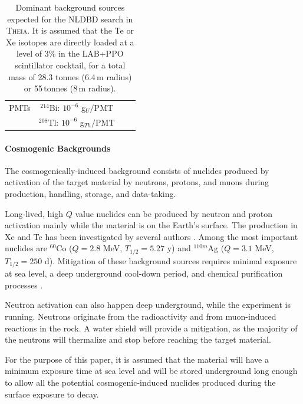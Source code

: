 \begin{table}[t]
\begin{tabular}{lccc}
PMTs                                        & $^{214}$Bi: $10^{-6}$ g$_{U}/$PMT            &                                               \\
                                            & $^{208}$Tl: $10^{-6}$ g$_{Th}/$PMT           &                                               \\
\bottomrule
\end{tabular}
\caption{Dominant background sources expected for the NLDBD search in
\textsc{Theia}. It is assumed that the Te or Xe isotopes are directly
loaded at a level of 3\% in the LAB+PPO scintillator cocktail, for a
total mass of 28.3 tonnes (6.4\,m radius) or 55\,tonnes (8\,m radius).}
\label{tab::bckg}
\end{table}

\paragraph{Cosmogenic Backgrounds}
The cosmogenically-induced background consists of nuclides produced by
activation of the target material by neutrons, protons, and muons during
production, handling, storage, and data-taking.

Long-lived, high $Q$ value nuclides can be produced by neutron and proton
activation mainly while the material is on the Earth's surface. The production
in Xe and Te has been investigated by several authors
\cite{mei09, baudis15, zhang16, norm05, bard97, wang15, lozza15}. Among
the most important nuclides are $^{60}$Co ($Q=2.8$ MeV, $T_{1/2}=5.27$ y) and
$^{110m}$Ag ($Q=3.1$ MeV, $T_{1/2}=250$ d). Mitigation of these background
sources requires minimal exposure at sea level, a deep underground cool-down
period, and chemical purification processes \cite{snop16}.

Neutron activation can also happen deep underground, while the experiment is
running. Neutrons originate from the radioactivity and from muon-induced
reactions in the rock. A water shield will provide a mitigation, as the
majority of the neutrons will thermalize and stop before reaching the target
material.

For the purpose of this paper, it is assumed that the material will have a
minimum exposure time at sea level and will be stored underground long
enough to allow all the potential cosmogenic-induced nuclides produced during
the surface exposure to decay.\\

